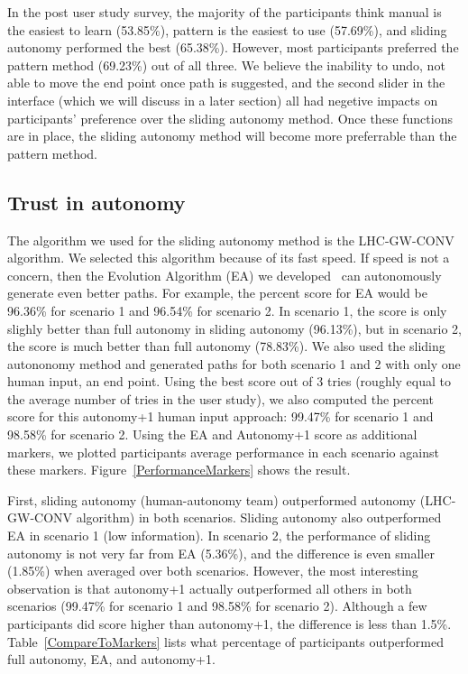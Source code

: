 \documentclass[journal]{IEEEtran}
\begin{document}
In the post user study survey, the majority of the participants think manual is the easiest to learn (53.85\%), pattern is the easiest to use (57.69\%), and sliding autonomy performed the best (65.38\%). However, most participants preferred the pattern method (69.23\%) out of all three. We believe the inability to undo, not able to move the end point once path is suggested, and the second slider in the interface (which we will discuss in a later section) all had negetive impacts on participants' preference over the sliding autonomy method. Once these functions are in place, the sliding autonomy method will become more preferrable than the pattern method.

\subsection{Trust in autonomy}

The algorithm we used for the sliding autonomy method is the LHC-GW-CONV algorithm. We selected this algorithm because of its fast speed. If speed is not a concern, then the Evolution Algorithm (EA) we developed~\cite{Lin2009UAV} can autonomously generate even better paths. For example, the percent score for EA would be 96.36\% for scenario 1 and 96.54\% for scenario 2. In scenario 1, the score is only slighly better than full autonomy in sliding autonomy (96.13\%), but in scenario 2, the score is much better than full autonomy (78.83\%). We also used the sliding autononomy method and generated paths for both scenario 1 and 2 with only one human input, an end point. Using the best score out of 3 tries (roughly equal to the average number of tries in the user study), we also computed the percent score for this autonomy+1 human input approach: 99.47\% for scenario 1 and 98.58\% for scenario 2. Using the EA and Autonomy+1 score as additional markers, we plotted participants average performance in each scenario against these markers. Figure~\ref{PerformanceMarkers} shows the result.

First, sliding autonomy (human-autonomy team) outperformed autonomy (LHC-GW-CONV algorithm) in both scenarios. Sliding autonomy also outperformed EA in scenario 1 (low information). In scenario 2, the performance of sliding autonomy is not very far from EA (5.36\%), and the difference is even smaller (1.85\%) when averaged over both scenarios. However, the most interesting observation is that autonomy+1 actually outperformed all others in both scenarios (99.47\% for scenario 1 and 98.58\% for scenario 2). Although a few participants did score higher than autonomy+1, the difference is less than 1.5\%. Table~\ref{CompareToMarkers} lists what percentage of participants outperformed full autonomy, EA, and autonomy+1.
\end{document}

